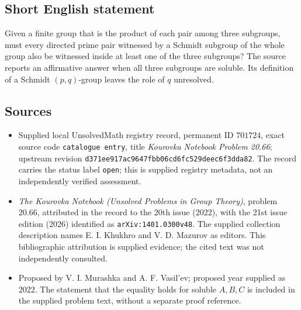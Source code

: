 \documentclass[11pt]{article}
\begin{document}
\subsection{Short English statement}
Given a finite group that is the product of each pair among three subgroups, must every directed prime pair witnessed by a Schmidt subgroup of the whole group also be witnessed inside at least one of the three subgroups? The source reports an affirmative answer when all three subgroups are soluble. Its definition of a Schmidt \((p,q)\)-group leaves the role of \(q\) unresolved.
\subsection{Sources}
\begin{itemize}
\item Supplied local UnsolvedMath registry record, permanent ID \(701724\), exact source code \texttt{catalogue entry}, title \emph{Kourovka Notebook Problem 20.66}; upstream revision \texttt{d371ee917ac9647fbb06cd6fc529deec6f3dda82}. The record carries the status label \texttt{open}; this is supplied registry metadata, not an independently verified assessment.
\item \emph{The Kourovka Notebook (Unsolved Problems in Group Theory)}, problem 20.66, attributed in the record to the 20th issue (2022), with the 21st issue edition (2026) identified as \texttt{arXiv:1401.0300v48}. The supplied collection description names E. I. Khukhro and V. D. Mazurov as editors. This bibliographic attribution is supplied evidence; the cited text was not independently consulted.
\item Proposed by V. I. Murashka and A. F. Vasil'ev; proposed year supplied as 2022. The statement that the equality holds for soluble \(A,B,C\) is included in the supplied problem text, without a separate proof reference.
\end{itemize}
\end{document}
